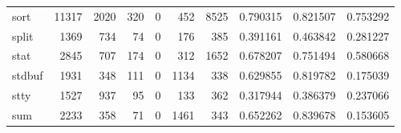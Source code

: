 \begin{tabular}{lrrrrrrrrr}
sort      &                                              11317 &                                               2020 &                                                320 &                                                  0 &                                                452 &                                               8525 &                                           0.790315 &                               0.821507 &                             0.753292 \\
split     &                                               1369 &                                                734 &                                                 74 &                                                  0 &                                                176 &                                                385 &                                           0.391161 &                               0.463842 &                             0.281227 \\
stat      &                                               2845 &                                                707 &                                                174 &                                                  0 &                                                312 &                                               1652 &                                           0.678207 &                               0.751494 &                             0.580668 \\
stdbuf    &                                               1931 &                                                348 &                                                111 &                                                  0 &                                               1134 &                                                338 &                                           0.629855 &                               0.819782 &                             0.175039 \\
stty      &                                               1527 &                                                937 &                                                 95 &                                                  0 &                                                133 &                                                362 &                                           0.317944 &                               0.386379 &                             0.237066 \\
sum       &                                               2233 &                                                358 &                                                 71 &                                                  0 &                                               1461 &                                                343 &                                           0.652262 &                               0.839678 &                             0.153605 \\

\end{tabular}
